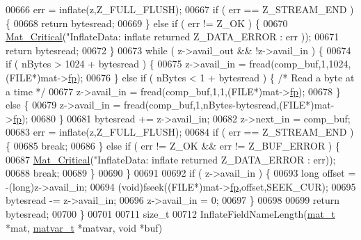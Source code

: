 \begin{DoxyCode}
{{{{{{{{{{{{{{{{{{{{00666     err = inflate(z,Z\_FULL\_FLUSH);
00667     \textcolor{keywordflow}{if} ( err == Z\_STREAM\_END ) \{
00668         \textcolor{keywordflow}{return} bytesread;
00669     \} \textcolor{keywordflow}{else} \textcolor{keywordflow}{if} ( err != Z\_OK ) \{
00670         \hyperlink{group__mat__util_gaf51f2bfbb5580f575e4dd79757e2b80c}{Mat\_Critical}(\textcolor{stringliteral}{"InflateData: inflate returned %
      Z\_DATA\_ERROR : err ));
00671         \textcolor{keywordflow}{return} bytesread;
00672     \}
00673     \textcolor{keywordflow}{while} ( z->avail\_out && !z->avail\_in ) \{
00674         \textcolor{keywordflow}{if} ( nBytes > 1024 + bytesread ) \{
00675             z->avail\_in = fread(comp\_buf,1,1024,(FILE*)mat->\hyperlink{struct__mat__t_a85f562e407ca9ad4d2a6e14f839432b7}{fp});
00676         \} \textcolor{keywordflow}{else} \textcolor{keywordflow}{if} ( nBytes < 1 + bytesread ) \{ \textcolor{comment}{/* Read a byte at a time */}
00677             z->avail\_in = fread(comp\_buf,1,1,(FILE*)mat->\hyperlink{struct__mat__t_a85f562e407ca9ad4d2a6e14f839432b7}{fp});
00678         \} \textcolor{keywordflow}{else} \{
00679             z->avail\_in = fread(comp\_buf,1,nBytes-bytesread,(FILE*)mat->\hyperlink{struct__mat__t_a85f562e407ca9ad4d2a6e14f839432b7}{fp});
00680         \}
00681         bytesread += z->avail\_in;
00682         z->next\_in = comp\_buf;
00683         err = inflate(z,Z\_FULL\_FLUSH);
00684         \textcolor{keywordflow}{if} ( err == Z\_STREAM\_END ) \{
00685             \textcolor{keywordflow}{break};
00686         \} \textcolor{keywordflow}{else} \textcolor{keywordflow}{if} ( err != Z\_OK && err != Z\_BUF\_ERROR ) \{
00687             \hyperlink{group__mat__util_gaf51f2bfbb5580f575e4dd79757e2b80c}{Mat\_Critical}(\textcolor{stringliteral}{"InflateData: inflate returned %
      Z\_DATA\_ERROR : err));
00688             \textcolor{keywordflow}{break};
00689         \}
00690     \}
00691 
00692     \textcolor{keywordflow}{if} ( z->avail\_in ) \{
00693         \textcolor{keywordtype}{long} offset = -(long)z->avail\_in;
00694         (\textcolor{keywordtype}{void})fseek((FILE*)mat->\hyperlink{struct__mat__t_a85f562e407ca9ad4d2a6e14f839432b7}{fp},offset,SEEK\_CUR);
00695         bytesread -= z->avail\_in;
00696         z->avail\_in = 0;
00697     \}
00698 
00699     \textcolor{keywordflow}{return} bytesread;
00700 \}
00701 
00711 \textcolor{keywordtype}{size\_t}
00712 InflateFieldNameLength(\hyperlink{struct__mat__t}{mat\_t} *mat, \hyperlink{group___m_a_t_structmatvar__t}{matvar\_t} *matvar, \textcolor{keywordtype}{void} *buf)
}}}}}}}}}}}}}}}}}}}}}}
\end{DoxyCode}
